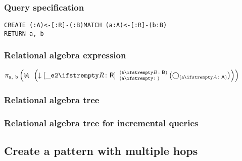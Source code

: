 \subsubsection*{Query specification}

\begin{lstlisting}
CREATE (:A)<-[:R]-(:B)MATCH (a:A)<-[:R]-(b:B)
RETURN a, b
\end{lstlisting}

\subsubsection*{Relational algebra expression}

$\projection{\var{a},~\var{b}} \left(\alldifferent{} \left(\expandin{\_e2}{R}{a}{b}{B} \left(\getvertices{a}{A}\right)\right)\right)$

\subsubsection*{Relational algebra tree}


\subsubsection*{Relational algebra tree for incremental queries}


\subsection{Create a pattern with multiple hops}

